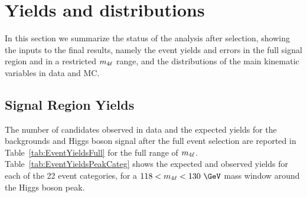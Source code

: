 
\section{Yields and distributions}

In this section we summarize the status of the analysis after selection, showing the inputs to the final results, namely the event yields and errors in the full signal region and in a restricted  $m_{4\ell}$ range, and the distributions of the main kinematic variables in data and MC. 

\subsection{Signal Region Yields}

The number of candidates observed in data and the expected yields for the backgrounds and Higgs boson signal after the full event selection are reported in Table~\ref{tab:EventYieldsFull} for the full range of $m_{4\ell}$. %
Table~\ref{tab:EventYieldsPeakCateg} shows the expected and observed yields for each of the 22 event categories, for a $118<\mllll<130~\GeV$ mass window around the Higgs boson peak.


